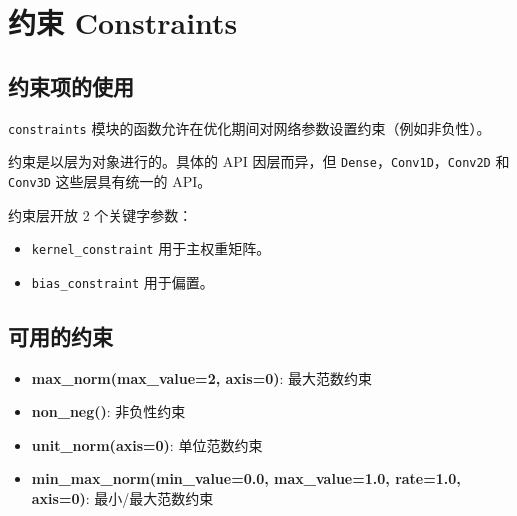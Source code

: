 \section{约束 Constraints}\label{constraints}

\subsection{约束项的使用}

\texttt{constraints}
模块的函数允许在优化期间对网络参数设置约束（例如非负性）。

约束是以层为对象进行的。具体的 API 因层而异，但
\texttt{Dense}，\texttt{Conv1D}，\texttt{Conv2D} 和 \texttt{Conv3D}
这些层具有统一的 API。

约束层开放 2 个关键字参数：

\begin{itemize}
\tightlist
\item
  \texttt{kernel\_constraint} 用于主权重矩阵。
\item
  \texttt{bias\_constraint} 用于偏置。
\end{itemize}

\begin{Shaded}
\begin{Highlighting}[]
\OperatorTok{=}\NormalTok{)))}
\end{Highlighting}
\end{Shaded}

\subsection{可用的约束}

\begin{itemize}
\tightlist
\item
  \textbf{max\_norm(max\_value=2, axis=0)}: 最大范数约束
\item
  \textbf{non\_neg()}: 非负性约束
\item
  \textbf{unit\_norm(axis=0)}: 单位范数约束
\item
  \textbf{min\_max\_norm(min\_value=0.0, max\_value=1.0, rate=1.0,
  axis=0)}: 最小/最大范数约束
\end{itemize}
\newpage
